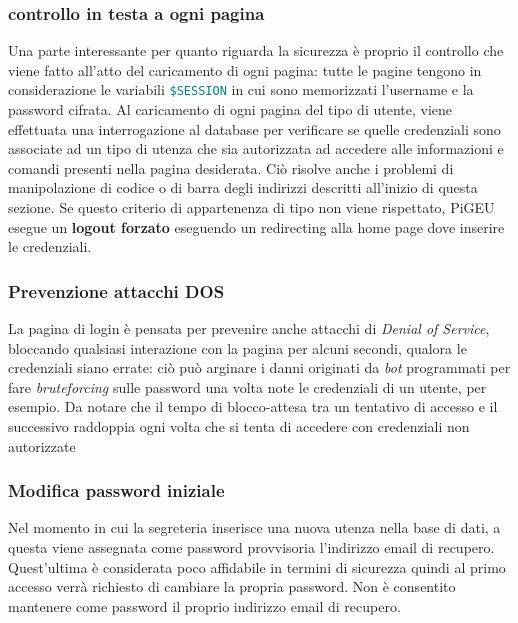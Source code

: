 \documentclass{article}
\newcommand{\sqltrigger}[1]{\texttt{\textcolor{teal}{#1}}}
\newcommand{\und}[0]{\textunderscore}
\begin{document}
\subsubsection{controllo in testa a ogni pagina}
Una parte interessante per quanto riguarda la sicurezza è proprio il controllo che viene fatto all'atto del caricamento di ogni pagina: tutte le pagine tengono in considerazione le variabili \sqltrigger{\$\und SESSION} in cui sono memorizzati l'username e la password cifrata. Al caricamento di ogni pagina del tipo di utente, viene effettuata una interrogazione al database per verificare se quelle credenziali sono associate ad un tipo di utenza che sia autorizzata ad accedere alle informazioni e comandi presenti nella pagina desiderata. Ciò risolve anche i problemi di manipolazione di codice o di barra degli indirizzi descritti all'inizio di questa sezione. Se questo criterio di appartenenza di tipo non viene rispettato, PiGEU esegue un \textbf{logout forzato} eseguendo un redirecting alla home page dove inserire le credenziali.
\subsubsection{Prevenzione attacchi DOS}
La pagina di login è pensata per prevenire anche attacchi di \textit{Denial of Service}, bloccando qualsiasi interazione con la pagina per alcuni secondi, qualora le credenziali siano errate: ciò può arginare i danni originati da \textit{bot} programmati per fare \textit{bruteforcing} sulle password una volta note le credenziali di un utente, per esempio. Da notare che il tempo di blocco-attesa tra un tentativo di accesso e il successivo raddoppia ogni volta che si tenta di accedere con credenziali non autorizzate
\subsubsection{Modifica password iniziale}
Nel momento in cui la segreteria inserisce una nuova utenza nella base di dati, a questa viene assegnata come password provvisoria l'indirizzo email di recupero. Quest'ultima è considerata poco affidabile in termini di sicurezza quindi al primo accesso verrà richiesto di cambiare la propria password. Non è consentito mantenere come password il proprio indirizzo email di recupero.
\end{document}
